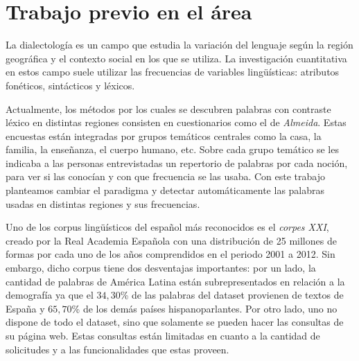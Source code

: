 




\section{Trabajo previo en el área}
La dialectología es un campo que estudia la variación del lenguaje según la región geográfica y el contexto social en los que se utiliza. La investigación cuantitativa en estos campo suele utilizar las frecuencias de variables lingüísticas: atributos fonéticos, sintácticos y léxicos.


Actualmente, los métodos por los cuales se descubren palabras con contraste léxico en distintas regiones
consisten en cuestionarios como el de \emph{Almeida}\cite{almeida1995variacion}.  Estas encuestas están integradas por grupos temáticos centrales como la casa, la familia, la enseñanza, el cuerpo humano, etc. Sobre cada grupo temático se les indicaba a las personas entrevistadas un repertorio de palabras por cada noción, para ver si las conocían y con que frecuencia se las usaba. 
Con este trabajo planteamos cambiar el paradigma y detectar automáticamente las palabras usadas en distintas regiones y sus frecuencias.

Uno de los corpus lingüísticos del español más reconocidos es el \emph{corpes XXI}\cite{espanolabanco}, creado por la Real Academia Española con una distribución de 25 millones de formas por cada uno de los años comprendidos en el periodo 2001 
a 2012. Sin embargo, dicho corpus tiene dos desventajas importantes: por un
lado, la cantidad de palabras de América Latina están subrepresentados en relación a la demografía ya que el $34,30$\% de las palabras del dataset provienen de textos de España y $65,70$\% de los demás países hispanoparlantes. Por otro lado, uno no dispone de todo el dataset, sino que solamente se pueden hacer las consultas de su página web. Estas consultas están limitadas en cuanto a la cantidad de solicitudes y a las funcionalidades que estas proveen.

